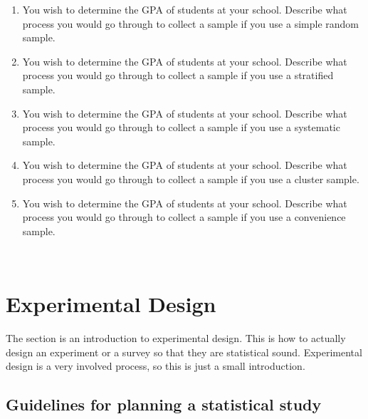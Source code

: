 \documentclass[]{book}
\begin{document}
\begin{enumerate}
\def\labelenumi{\arabic{enumi}.}
\setcounter{enumi}{2}
\item
  You wish to determine the GPA of students at your school. Describe
  what process you would go through to collect a sample if you use a
  simple random sample.
\item
  You wish to determine the GPA of students at your school. Describe
  what process you would go through to collect a sample if you use a
  stratified sample.
\item
  You wish to determine the GPA of students at your school. Describe
  what process you would go through to collect a sample if you use a
  systematic sample.
\item
  You wish to determine the GPA of students at your school. Describe
  what process you would go through to collect a sample if you use a
  cluster sample.
\item
  You wish to determine the GPA of students at your school. Describe
  what process you would go through to collect a sample if you use a
  convenience sample.
\end{enumerate}

\textbf{\\
}

\hypertarget{experimental-design}{%
\section{Experimental Design}\label{experimental-design}}

The section is an introduction to experimental design. This is how to
actually design an experiment or a survey so that they are statistical
sound. Experimental design is a very involved process, so this is just a
small introduction.

\hypertarget{guidelines-for-planning-a-statistical-study}{%
\subsection{Guidelines for planning a statistical study}\label{guidelines-for-planning-a-statistical-study}}
\end{document}

